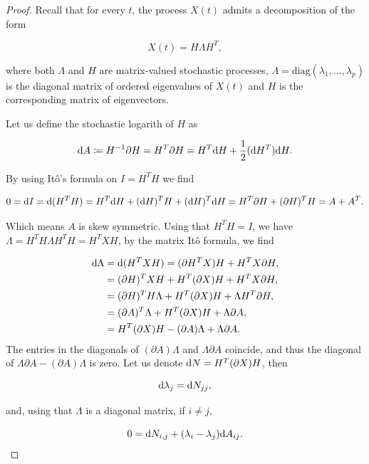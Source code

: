 \begin{proof}
    Recall that for every $t$, the process $X(t)$ admits a decomposition of the form 

    \[ X(t) = H \Lambda H^T, \]

    \noindent where both $\Lambda$ and $H$ are matrix-valued stochastic processes, $\Lambda = \mathrm{diag}(\lambda_1, \dots, \lambda_p)$ is the diagonal matrix of ordered eigenvalues of $X(t)$ and $H$ is the corresponding matrix of eigenvectors.

    Let us define the stochastic logarith of $H$ as

    \begin{equation*}
        \mathrm d A \coloneqq H^{-1} \partial H = H^T \partial H = H^T \mathrm d H + \frac12(\mathrm d H^T)\mathrm d H.
    \end{equation*}

    By using Itô's formula on $I = H^T H$ we find

    \begin{align*}
        0 = \mathrm d I = \mathrm d(H^T H) = H^T\mathrm d H + (\mathrm d H)^T H + (\mathrm d H)^T \mathrm d H = H^T\partial H + (\partial H)^T H = A + A^T.
    \end{align*}

    Which means $A$ is skew symmetric. Using that $H^T H = I$, we have $\Lambda = H^T H \Lambda H^T H = H^T X H$, by the matrix Itô formula, we find 


    \begin{align*} 
        \mathrm d \Lambda & = \mathrm d(H^TXH) = (\partial H^TX)H + H^TX\partial H,\\ 
        & = (\partial H)^T XH + H^T(\partial X)H + H^T X \partial H,\\
        & = (\partial H)^T H\Lambda + H^T(\partial X) H + \Lambda H^T \partial H,\\
        & = (\partial A)^T \Lambda + H^T(\partial X) H + \Lambda \partial A,\\
        & = H^T(\partial X) H -  (\partial A)\Lambda + \Lambda \partial A.
    \end{align*}
    The entries in the diagonals of $(\partial A)\Lambda$ and $\Lambda\partial A$ coincide, and thus the diagonal of $\Lambda\partial A-(\partial A)\Lambda$ is zero. Let us denote $\mathrm d N = H^T(\partial X) H$, then

    \[ \mathrm d \lambda_j = \mathrm d N_{jj}, \]

    \noindent and, using that $\Lambda$ is a diagonal matrix, if $i\neq j$,

    \[ 0 = \mathrm d N_{i,j} + (\lambda_i - \lambda_j)\mathrm d A_{ij}. \]


\end{proof}

